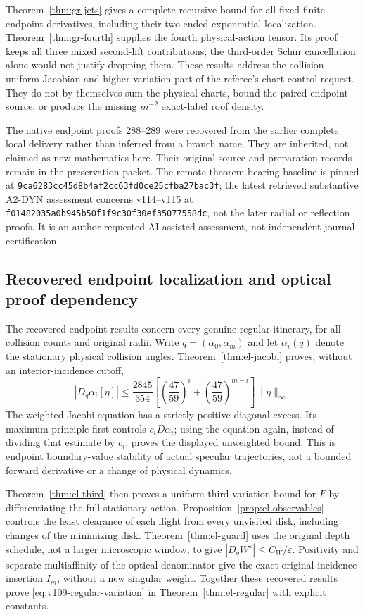 \documentclass[11pt,reqno]{amsart}
\numberwithin{equation}{section}
\theoremstyle{definition}\newtheorem{definition}[theorem]{Definition}
\theoremstyle{remark}\newtheorem{remark}[theorem]{Remark}
\begin{document}
Theorem~\ref{thm:gr-jets} gives a complete recursive bound for all
fixed finite endpoint derivatives, including their two-ended
exponential localization. Theorem~\ref{thm:gr-fourth} supplies the
fourth physical-action tensor. Its proof keeps all three mixed
second-lift contributions; the third-order Schur cancellation alone
would not justify dropping them. These results address the
collision-uniform Jacobian and higher-variation part of the
referee's chart-control request. They do not by themselves sum
the physical charts, bound the paired endpoint source, or produce
the missing $m^{-2}$ exact-label roof density.

The native endpoint proofs 288--289 were recovered from the earlier
complete local delivery rather than inferred from a branch name.
They are inherited, not claimed as new mathematics here. Their
original source and preparation records remain in the preservation
packet. The remote theorem-bearing baseline is pinned at
\texttt{9ca6283c\allowbreak c45d8b4a\allowbreak f2cc63fd\allowbreak 0ce25cfb\allowbreak a27bac3f}; the latest
retrieved substantive A2-DYN assessment concerns v114--v115 at
\texttt{f0148203\allowbreak 5a0b945b\allowbreak 50f1f9c3\allowbreak 0f30ef35\allowbreak 077558dc}, not the later
radial or reflection proofs. It is an author-requested AI-assisted
assessment, not independent journal certification.

\subsection*{Recovered endpoint localization and optical proof dependency}
The recovered endpoint results concern every genuine regular itinerary, for all collision
counts and original radii. Write $q=(\alpha_0,\alpha_m)$ and let
$\alpha_i(q)$ denote the stationary physical collision angles. Theorem~\ref{thm:el-jacobi}
proves, without an interior-incidence cutoff,
\[
 |D_q\alpha_i[\eta]|\leq \frac{2845}{354}
 \left[\left(\frac{47}{59}\right)^i+
       \left(\frac{47}{59}\right)^{m-i}\right]\|\eta\|_\infty.
\]
The weighted Jacobi equation has a strictly positive diagonal excess.
Its maximum principle first controls $c_iD\alpha_i$; using the equation
again, instead of dividing that estimate by $c_i$, proves the displayed
unweighted bound. This is endpoint boundary-value stability of actual
specular trajectories, not a bounded forward derivative or a change of
physical dynamics.

Theorem~\ref{thm:el-third} then proves a uniform third-variation bound for
$F$ by differentiating the full stationary action. Proposition~\ref{prop:el-observables}
controls the least clearance of each flight from every unvisited disk,
including changes of the minimizing disk. Theorem~\ref{thm:el-guard}
uses the original depth schedule, not a larger microscopic window, to
give $|D_qW^\varepsilon|\leq C_W/\varepsilon$. Positivity and separate
multiaffinity of the optical denominator give the exact original
incidence insertion $I_m$, without a new singular weight. Together these
recovered results prove \eqref{eq:v109-regular-variation} in
Theorem~\ref{thm:el-regular} with explicit constants.
\end{document}
